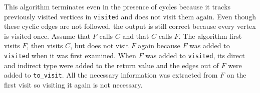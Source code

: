 This algorithm terminates even in the presence of cycles because it tracks previously visited vertices in \lstinline{visited} and does not visit them again.  Even though these cyclic edges are not followed, the output is still correct because every vertex is visited once.  Assume that $F$ calls $C$ and that $C$ calls $F$.  The algorithm first visits $F$, then visits $C$, but does not visit $F$ again because $F$ was added to \lstinline{visited} when it was first examined.  When $F$ was added to \lstinline{visited}, its direct and indirect type were added to the return value and the edges out of $F$ were added to \lstinline{to_visit}.  All the necessary information was extracted from $F$ on the first visit so visiting it again is not necessary.

